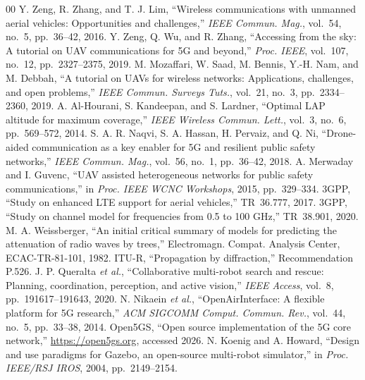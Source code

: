 \documentclass[conference]{IEEEtran}
\begin{document}
\footnotesize
\begin{thebibliography}{00}
 Y. Zeng, R. Zhang, and T. J. Lim, ``Wireless communications
with unmanned aerial vehicles: Opportunities and challenges,'' \textit{IEEE Commun.
Mag.}, vol.~54, no.~5, pp.~36--42, 2016.
 Y. Zeng, Q. Wu, and R. Zhang, ``Accessing from the sky: A
tutorial on UAV communications for 5G and beyond,'' \textit{Proc. IEEE}, vol.~107,
no.~12, pp.~2327--2375, 2019.
 M. Mozaffari, W. Saad, M. Bennis, Y.-H. Nam, and
M. Debbah, ``A tutorial on UAVs for wireless networks: Applications, challenges, and
open problems,'' \textit{IEEE Commun. Surveys Tuts.}, vol.~21, no.~3, pp.~2334--2360,
2019.
 A. Al-Hourani, S. Kandeepan, and S. Lardner, ``Optimal
LAP altitude for maximum coverage,'' \textit{IEEE Wireless Commun. Lett.}, vol.~3,
no.~6, pp.~569--572, 2014.
 S. A. R. Naqvi, S. A. Hassan, H. Pervaiz, and Q. Ni,
``Drone-aided communication as a key enabler for 5G and resilient public safety
networks,'' \textit{IEEE Commun. Mag.}, vol.~56, no.~1, pp.~36--42, 2018.
 A. Merwaday and I. Guvenc, ``UAV assisted heterogeneous
networks for public safety communications,'' in \textit{Proc. IEEE WCNC Workshops},
2015, pp.~329--334.
 3GPP, ``Study on enhanced LTE support for aerial vehicles,''
TR~36.777, 2017.
 3GPP, ``Study on channel model for frequencies from 0.5 to 100
GHz,'' TR~38.901, 2020.
 M. A. Weissberger, ``An initial critical summary of models
for predicting the attenuation of radio waves by trees,'' Electromagn. Compat. Analysis
Center, ECAC-TR-81-101, 1982.
 ITU-R, ``Propagation by diffraction,'' Recommendation P.526.
 J. P. Queralta \textit{et al.}, ``Collaborative
multi-robot search and rescue: Planning, coordination, perception, and active vision,''
\textit{IEEE Access}, vol.~8, pp.~191617--191643, 2020.
 N. Nikaein \textit{et al.}, ``OpenAirInterface: A flexible
platform for 5G research,'' \textit{ACM SIGCOMM Comput. Commun. Rev.}, vol.~44, no.~5,
pp.~33--38, 2014.
 Open5GS, ``Open source implementation of the 5G core network,''
\url{https://open5gs.org}, accessed 2026.
 N. Koenig and A. Howard, ``Design and use paradigms for
Gazebo, an open-source multi-robot simulator,'' in \textit{Proc. IEEE/RSJ IROS}, 2004,
pp.~2149--2154.
\end{thebibliography}
\end{document}
